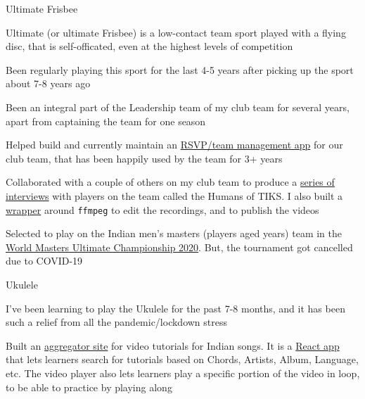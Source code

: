 
\begin{cventries}
  \cventry
      {Ultimate Frisbee}
      {}
      {} %
      {} %
      {
        \begin{cvitems} %
        \item {Ultimate (or ultimate Frisbee) is a low-contact team sport played with a flying disc, that is self-officated, even at the highest levels of competition}
        \item {Been regularly playing this sport for the last 4-5 years after picking up the sport about 7-8 years ago}
        \item {Been an integral part of the Leadership team of my club team for several years, apart from captaining the team for one season}
        \item {Helped build and currently maintain an \href{https://rsvp.thatteidlikaalsoup.team/features}{RSVP/team management app} for our club team, that has been happily used by the team for 3+ years}
        \item {Collaborated with a couple of others on my club team to produce a \href{https://www.instagram.com/tiks_ultimate/channel/}{series of interviews} with players on the team called the Humans of TIKS. I also built a \href{https://github.com/thatte-idli-kaal-soup/humans}{wrapper} around \texttt{ffmpeg} to edit the recordings, and to publish the videos}
        \item {Selected to play on the Indian men's masters (players aged  years) team in the \href{https://wmuc2020.com/}{World Masters Ultimate Championship 2020}. But, the tournament got cancelled due to COVID-19}
        \end{cvitems}
      }
  \cventry
      {Ukulele}
      {}
      {} %
      {} %
      {
        \begin{cvitems} %
        \item {I've been learning to play the Ukulele for the past 7-8 months, and it has been such a relief from all the pandemic/lockdown stress}
        \item {Built an \href{https://ukulele.muse-amuse.in/}{aggregator site} for video tutorials for Indian songs. It is a \href{https://github.com/punchagan/ukulele-tutorials/}{React app} that lets learners search for tutorials based on Chords, Artists, Album, Language, etc. The video player also lets learners play a specific portion of the video in loop, to be able to practice by playing along}
        \end{cvitems}
      }
\end{cventries}
